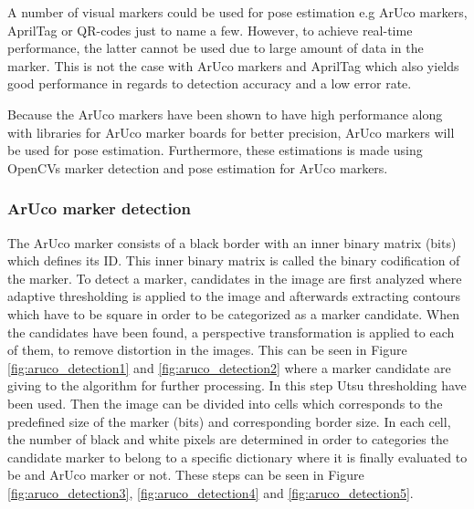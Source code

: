 \documentclass[../Head/report.tex]{subfiles}
\begin{document}
A number of visual markers could be used for pose estimation e.g ArUco markers, AprilTag or QR-codes just to name a few. However, to achieve real-time performance, the latter cannot be used due to large amount of data in the marker. This is not the case with ArUco markers and AprilTag which also yields good performance in regards to detection accuracy and a low error rate. \cite{visualmarkers} 

Because the ArUco markers have been shown to have high performance along with libraries for ArUco marker boards for better precision, ArUco markers will be used for pose estimation.       Furthermore, these estimations is made using OpenCVs marker detection and pose estimation for ArUco markers.

\subsubsection{ArUco marker detection}

The ArUco marker consists of a black border with an inner binary matrix (bits) which defines its ID. This inner binary matrix is called the binary codification of the marker. To detect a marker, candidates in the image are first analyzed where adaptive thresholding is applied to the image and afterwards extracting contours which have to be square in order to be categorized as a marker candidate. When the candidates have been found, a perspective transformation is applied to each of them, to remove distortion in the images. This can be seen in Figure \ref{fig:aruco_detection1} and \ref{fig:aruco_detection2} where a marker candidate are giving to the algorithm for further processing. In this step Utsu thresholding have been used. Then the image can be divided into cells which corresponds to the predefined size of the marker (bits) and corresponding border size. In each cell, the number of black and white pixels are determined in order to categories the candidate marker to belong to a specific dictionary where it is finally evaluated to be and ArUco marker or not. These steps can be seen in Figure \ref{fig:aruco_detection3}, \ref{fig:aruco_detection4} and \ref{fig:aruco_detection5}.       
\end{document}

